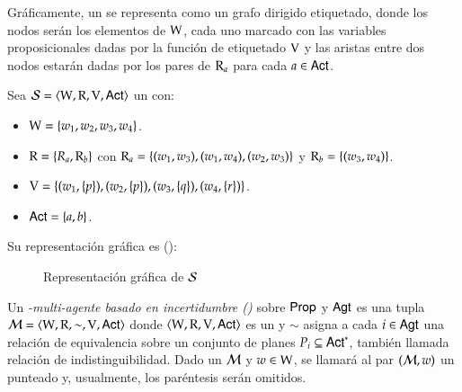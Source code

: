 Gráficamente, un \lts se representa como un grafo dirigido etiquetado, donde los nodos serán los elementos de $\mathrm{W}$, cada uno marcado con las variables proposicionales 
dadas por la función de etiquetado $\mathrm{V}$ y las aristas entre dos nodos estarán dadas por los pares de $\mathrm{R}_a$ para cada $a \in {\rm \sf Act}$.

\begin{ejemplo}\label{ejemplo:lts}
    Sea $\mathcal{S} = \langle \mathrm{W}, \mathrm{R}, \mathrm{V}, {\rm \sf Act} \rangle$ un \lts con:
    
    \begin{itemize}
        \item $\mathrm{W} = \{w_1, w_2, w_3, w_4\}$.
        \item $\mathrm{R} = \{R_a, \mathrm{R}_b\}$ con $\mathrm{R}_a = \{(w_1,w_3), (w_1,w_4), (w_2,w_3)\}$ y $\mathrm{R}_b = \{(w_3,w_4)\}$.
        \item $\mathrm{V} = \{(w_1, \{p\}), (w_2, \{p\}), (w_3, \{q\}), (w_4, \{r\})\}$.
        \item ${\rm \sf Act} = \{a, b\}$.
    \end{itemize}

    Su representación gráfica es ():
    \begin{figure}[h]
        \centering
        \caption{Representación gráfica de $\mathcal{S}$}
        \label{fig:lts}
    \end{figure}

\end{ejemplo}


\begin{definicion}
    Un \emph{\lts-multi-agente basado en incertidumbre (\ults)} sobre ${\rm \sf Prop}$ y ${\rm \sf Agt}$ es una tupla $\mathcal{M} = \langle \mathrm{W},\mathrm{R},\sim,\mathrm{V},{\rm \sf Act} \rangle$ 
    donde $\langle \mathrm{W},\mathrm{R},\mathrm{V},{\rm \sf Act} \rangle$ es un \lts y $\sim$ asigna a cada $i \in {\rm \sf Agt}$ una relación de equivalencia sobre un conjunto de planes
    $P_i \subseteq {\rm \sf Act}^*$, también llamada relación de indistinguibilidad. Dado un \ults $\mathcal{M}$ y $w \in \mathrm{W}$, se llamará 
    al par $(\mathcal{M},w)$ un \ults punteado y, usualmente, los paréntesis serán omitidos.
\end{definicion}

